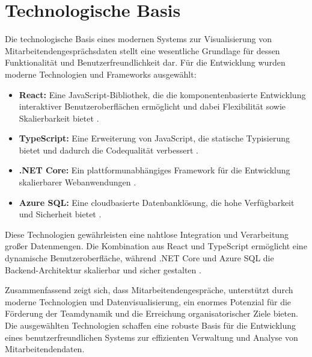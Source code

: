 \section{Technologische Basis}
Die technologische Basis eines modernen Systems zur Visualisierung von Mitarbeitendengesprächsdaten stellt eine wesentliche Grundlage für dessen Funktionalität und Benutzerfreundlichkeit dar. Für die Entwicklung wurden moderne Technologien und Frameworks ausgewählt:

\begin{itemize}
    \item \textbf{React:} Eine JavaScript-Bibliothek, die die komponentenbasierte Entwicklung interaktiver Benutzeroberflächen ermöglicht und dabei Flexibilität sowie Skalierbarkeit bietet \cite{stefanov2021react}.
    \item \textbf{TypeScript:} Eine Erweiterung von JavaScript, die statische Typisierung bietet und dadurch die Codequalität verbessert \cite{typeScriptDocumentation}.
    \item \textbf{.NET Core:} Ein plattformunabhängiges Framework für die Entwicklung skalierbarer Webanwendungen \cite{microsoftDotNet}.
    \item \textbf{Azure SQL:} Eine cloudbasierte Datenbanklösung, die hohe Verfügbarkeit und Sicherheit bietet \cite{azureDocumentation}.
\end{itemize}

Diese Technologien gewährleisten eine nahtlose Integration und Verarbeitung großer Datenmengen. Die Kombination aus React und TypeScript ermöglicht eine dynamische Benutzeroberfläche, während .NET Core und Azure SQL die Backend-Architektur skalierbar und sicher gestalten \cite{microsoftAzure}.

Zusammenfassend zeigt sich, dass Mitarbeitendengespräche, unterstützt durch moderne Technologien und Datenvisualisierung, ein enormes Potenzial für die Förderung der Teamdynamik und die Erreichung organisatorischer Ziele bieten. Die ausgewählten Technologien schaffen eine robuste Basis für die Entwicklung eines benutzerfreundlichen Systems zur effizienten Verwaltung und Analyse von Mitarbeitendendaten.

